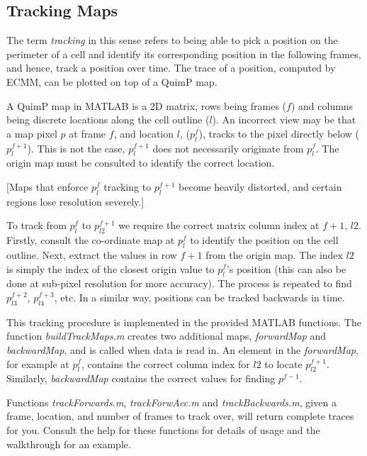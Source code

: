 \documentclass[a4paper,12pt]{article}
\begin{document}
\subsection{Tracking Maps}
\label{trackingMaps}

The term \textit{tracking} in this sense refers to being able to pick a position on the perimeter of a cell and identify its corresponding
position in the following frames, and hence, track a position over time.  The trace of a position, computed by ECMM,
can be plotted on top of a QuimP map. 

A QuimP map in MATLAB is a 2D matrix, rows being frames ($f$) and columns being discrete locations along the cell outline ($l$).
An incorrect view may be that a map pixel $p$ at frame $f$, and location $l$, ($p^{f}_{l}$),  tracks to the pixel directly 
below ($p^{f+1}_{l}$).  This is not the case,
$p^{f+1}_{l}$ does not necessarily originate from $p^{f}_{l}$.  The origin map must be consulted to identify the
correct location.

[Maps that enforce $p^{f}_{l}$ tracking to $p^{f+1}_{l}$ become heavily distorted, and certain regions lose
resolution severely.]

To track from $p^{f}_{l}$ to $p^{f+1}_{l2}$ we require the correct matrix column index at $f+1$, $l2$.  Firstly, 
consult the co-ordinate map at $p^{f}_{l}$ to identify the position on the cell outline.  Next, extract
the values in row $f+1$ from the origin map.  The index $l2$ is simply the index of the closest origin value to $p^{f}_{l}$'s position
(this can also be done at sub-pixel resolution for more accuracy).
The process is repeated to find $p^{f+2}_{l3}$, $p^{f+3}_{l4}$, etc.  In a similar way, positions can be tracked backwards in time.

This tracking procedure is implemented in the provided MATLAB functions. The function \textit{buildTrackMaps.m} creates
two additional maps, \textit{forwardMap} and \textit{backwardMap}, and is called when data is read in.
An element in the \textit{forwardMap}, for example at $p^{f}_{l}$, contains the correct column index for $l2$ to
locate $p^{f+1}_{l2}$.  Similarly, \textit{backwardMap} contains the correct values for finding $p^{f-1}$.

Functions \textit{trackForwards.m}, \textit{trackForwAcc.m} and \textit{trackBackwards.m}, given a frame, location,
and number of frames to track over, will return complete traces for you.
Consult the help for these functions for details of usage and the walkthrough for an example.
\end{document}
